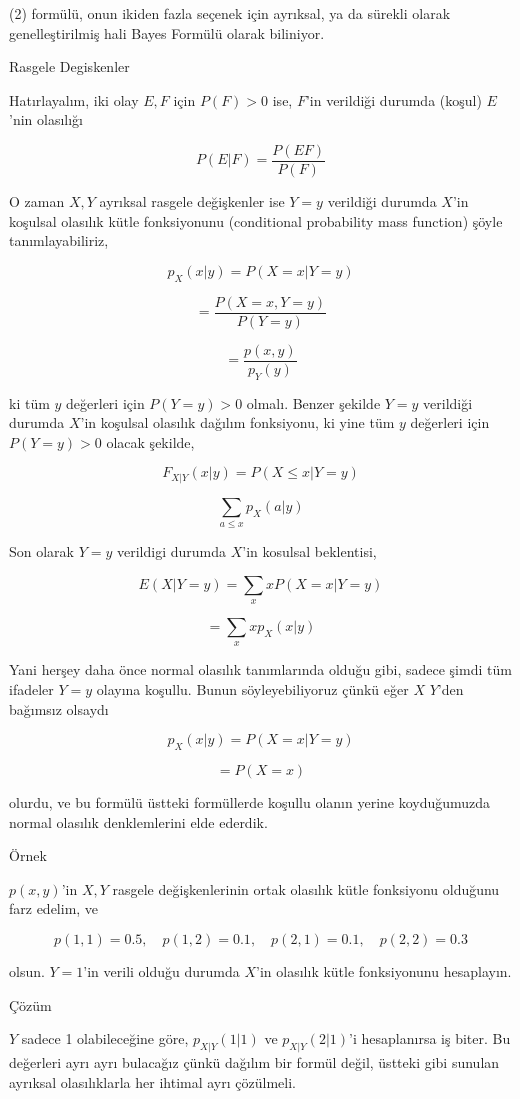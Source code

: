 \documentclass[12pt,fleqn]{article}\usepackage{../../common}
\begin{document}
(2) formülü, onun ikiden fazla seçenek için ayrıksal, ya da sürekli olarak
genelleştirilmiş hali Bayes Formülü olarak biliniyor. 

Rasgele Degiskenler

Hatırlayalım, iki olay $E,F$ için $P(F)>0$ ise, $F$'in verildiği durumda (koşul)
$E$'nin olasılığı

$$ P(E|F) = \frac{P(EF)}{P(F)} $$

O zaman $X,Y$ ayrıksal rasgele değişkenler ise $Y=y$ verildiği durumda $X$'in
koşulsal olasılık kütle fonksiyonunu (conditional probability mass function)
şöyle tanımlayabiliriz,

$$ p_X(x|y) = P(X=x|Y=y) $$

$$ = \frac{P(X=x,Y=y)}{P(Y=y)} $$

$$ = \frac{p(x,y)}{p_Y(y)} $$

ki tüm $y$ değerleri için $P(Y = y) > 0$ olmalı. Benzer şekilde $Y=y$
verildiği durumda $X$'in koşulsal olasılık dağılım fonksiyonu, ki yine tüm $y$
değerleri için $P(Y = y) > 0$ olacak şekilde,

$$ F_{X|Y}(x|y) = P(X \le x | Y=y) $$

$$ \sum _{a \le x} p_X(a|y)$$

Son olarak $Y=y$ verildigi durumda $X$'in kosulsal beklentisi,

$$ E(X|Y=y) = \sum _{x}x P(X=x | Y=y ) $$

$$ = \sum_x x p_X(x|y) $$

Yani herşey daha önce normal olasılık tanımlarında olduğu gibi, sadece şimdi
tüm ifadeler $Y=y$ olayına koşullu. Bunun söyleyebiliyoruz çünkü eğer $X$
$Y$'den bağımsız olsaydı

$$ p_X(x|y) = P(X=x|Y=y)  $$

$$ = P(X=x) $$

olurdu, ve bu formülü üstteki formüllerde koşullu olanın yerine koyduğumuzda
normal olasılık denklemlerini elde ederdik.

Örnek

$p(x,y)$'in $X,Y$ rasgele değişkenlerinin ortak olasılık kütle fonksiyonu
olduğunu farz edelim, ve

$$ p(1,1) = 0.5, \quad
p(1,2) = 0.1, \quad
p(2,1) = 0.1, \quad
p(2,2) = 0.3
$$

olsun. $Y=1$'in verili olduğu durumda $X$'in olasılık kütle fonksiyonunu
hesaplayın.

Çözüm

$Y$ sadece 1 olabileceğine göre, $p_{X|Y}(1|1)$ ve $p_{X|Y}(2|1)$'i hesaplanırsa
iş biter. Bu değerleri ayrı ayrı bulacağız çünkü dağılım bir formül değil,
üstteki gibi sunulan ayrıksal olasılıklarla her ihtimal ayrı çözülmeli.
\end{document}
